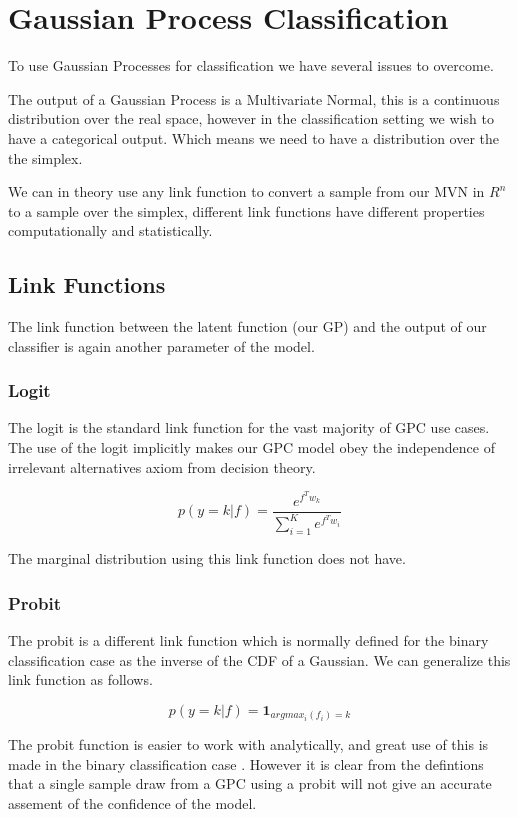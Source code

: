 \documentclass[12pt, a4paper]{report}
\theoremstyle{definition}
\theoremstyle{definition}
\theoremstyle{definition}
\begin{document}
\section{Gaussian Process Classification}


To use Gaussian Processes for classification we have several issues to overcome.

The output of a Gaussian Process is a Multivariate Normal, this is a continuous distribution over the real space, however in the classification setting we wish to have a categorical output. Which means we need to have a distribution over the the simplex.

We can in theory use any link function to convert a sample from our MVN in $R^n$ to a sample over the simplex, different link functions have different properties computationally and statistically.

\subsection{Link Functions}

The link function between the latent function (our GP) and the output of our classifier is again another parameter of the model.

\subsubsection{Logit}

The logit is the standard link function for the vast majority of GPC use cases. The use of the logit implicitly makes our GPC model obey the independence of irrelevant alternatives axiom from decision theory. 


$$p\left( y = k | f\right) = \frac{e^{f^T w_k}}{\sum_{i=1}^{K} e^{f^T w_i}}$$


The marginal distribution using this link function does not have.


\subsubsection{Probit}

The probit is a different link function which is normally defined for the binary classification case as the inverse of the CDF of a Gaussian. We can generalize this link function as follows.

$$p\left(y = k | f\right) = \mathbf{1}_{argmax_i(f_i) = k}$$


The probit function is easier to work with analytically, and great use of this is made in the binary classification case \cite{houlsby2011bayesian}. However it is clear from the defintions that a single sample draw from a GPC using a probit will not give an accurate assement of the confidence of the model.
\end{document}
